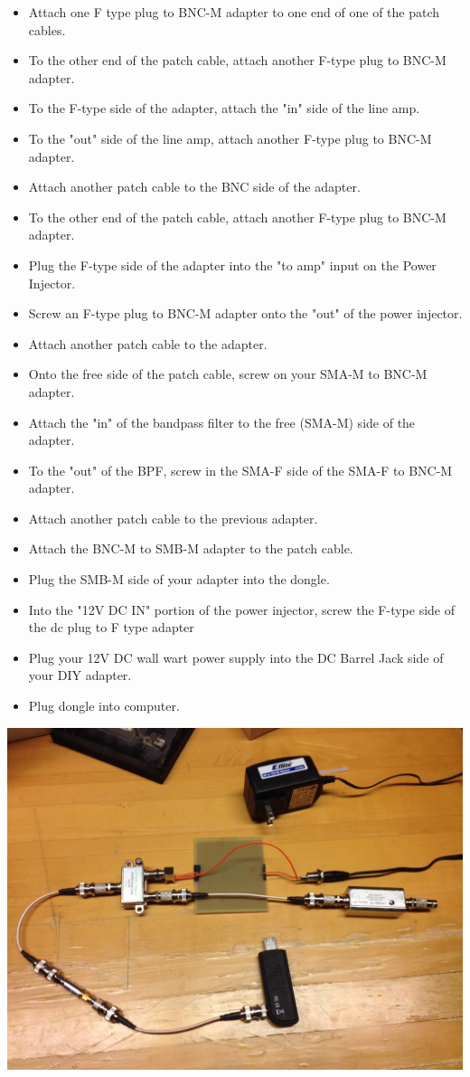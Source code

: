 \documentclass[11pt]{article} %
\begin{document}
 
\begin{itemize}
\item Attach one F type plug to BNC-M adapter to one end of one of the patch cables.
\item To the other end of the patch cable, attach another F-type plug to BNC-M adapter.
\item To the F-type side of the adapter, attach the "in" side of the line amp.
\item To the "out" side of the line amp, attach another F-type plug to BNC-M adapter.
\item Attach another patch cable to the BNC side of the adapter.
\item To the other end of the patch cable, attach another F-type plug to BNC-M adapter.
\item Plug the F-type side of the adapter into the "to amp" input on the Power Injector.
\item Screw an F-type plug to BNC-M adapter onto the "out" of the power injector.
\item Attach another patch cable to the adapter.
\item Onto the free side of the patch cable, screw on your SMA-M to BNC-M adapter.
\item Attach the "in" of the bandpass filter to the free (SMA-M) side of the adapter.
\item To the "out" of the BPF, screw in the SMA-F side of the SMA-F to BNC-M adapter.
\item Attach another patch cable to the previous adapter.
\item Attach the BNC-M to SMB-M adapter to the patch cable.
\item Plug the SMB-M side of your adapter into the dongle.
\item Into the "12V DC IN" portion of the power injector, screw the F-type side of the dc plug to F type adapter
\item Plug your 12V DC wall wart power supply into the DC Barrel Jack side of your DIY adapter.
\item Plug dongle into computer.
\end{itemize}

\begin{center}
\includegraphics[scale=0.20]{lnainterface/05.jpeg}
\end{center}
\end{document}
